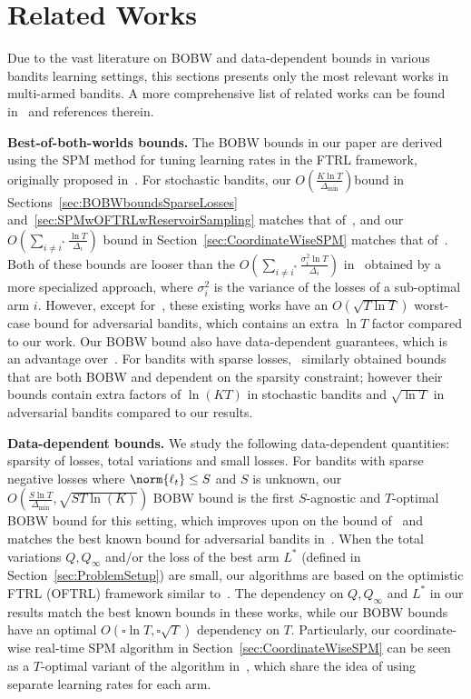 \section{Related Works}
\label{sec:RelatedWorks}
Due to the vast literature on BOBW and data-dependent bounds in various bandits learning settings, this sections presents only the most relevant works in multi-armed bandits.
A more comprehensive list of related works can be found in~\citet{ItoCOLT2024,Tsuchiya2023stabilitypenaltyadaptive} and references therein.

\textbf{Best-of-both-worlds bounds.} The BOBW bounds in our paper are derived using the SPM method for tuning learning rates in the FTRL framework, originally proposed in~\citet{ItoCOLT2024}. For stochastic bandits, our $O(\frac{K\ln{T}}{\Delta_{\min}})$bound  in Sections~\ref{sec:BOBWboundsSparseLosses} and~\ref{sec:SPMwOFTRLwReservoirSampling} matches that of~\citet{WeiAndLuo2018aBroadOMD,ItoCOLT2024}, and our $O(\sum_{i \neq i^*}\frac{\ln{T}}{\Delta_i})$ bound in Section~\ref{sec:CoordinateWiseSPM} matches that of~\citet{Zimmert2021TsallisINF, Ito2021HybridDataMABBound}. 
Both of these bounds are looser than the $O(\sum_{i \neq i^*}\frac{\sigma_i^2 \ln{T}}{\Delta_i})$ in~\citet{ItoCOLT2022aVariance} obtained by a more specialized approach, where $\sigma_i^2$ is the variance of the losses of a sub-optimal arm $i$.
However, except for~\citet{ItoCOLT2024}, these existing works have an $O(\sqrt{T\ln{T}})$ worst-case bound for adversarial bandits, which contains an extra $\ln{T}$ factor compared to our work. 
Our BOBW bound also have data-dependent guarantees, which is an advantage over~\citet{ItoCOLT2024}. 
For bandits with sparse losses,~\citet{Tsuchiya2023stabilitypenaltyadaptive} similarly obtained bounds that are both BOBW and dependent on the sparsity constraint; however their bounds contain extra factors of $\ln(KT)$ in stochastic bandits and $\sqrt{\ln{T}}$ in adversarial bandits compared to our results.

\textbf{Data-dependent bounds.} We study the following data-dependent quantities: sparsity of losses, total variations and small losses. 
For bandits with sparse negative losses where $\norm{\ell_t} \leq S$ and $S$ is unknown, our $O(\frac{S\ln{T}}{\Delta_{\min}}, \sqrt{ST\ln(K)})$ BOBW bound is the first $S$-agnostic and $T$-optimal BOBW bound for this setting, which improves upon on the bound of~\citet{Tsuchiya2023stabilitypenaltyadaptive} and matches the best known bound for adversarial bandits in~\citet{Bubeck2018ALT}.
When the total variations $Q, Q_\infty$ and/or the loss of the best arm $L^*$ (defined in Section~\ref{sec:ProblemSetup}) are small, our algorithms are based on the optimistic FTRL (OFTRL) framework similar to~\citet{HazanAndKale11a,Bubeck2018ALT,ItoCOLT2022aVariance}. 
The dependency on $Q, Q_\infty$ and $L^*$ in our results match the best known bounds in these works, while our BOBW bounds have an optimal $O(\square\ln{T}, \square\sqrt{T})$ dependency on $T$. 
Particularly, our coordinate-wise real-time SPM algorithm in Section~\ref{sec:CoordinateWiseSPM} can be seen as a $T$-optimal variant of the algorithm in~\citet{ItoCOLT2022aVariance}, which share the idea of using separate learning rates for each arm.

